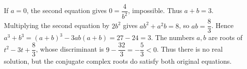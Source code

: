 If $a=0$, the second equation gives $0=\dfrac{4}{b^2}$, impossible. Thus $a+b=3$. Multiplying the second equation by $2b^2$ gives $ab^2+a^2b=8$, so $ab=\dfrac{8}{3}$. Hence $a^3+b^3=(a+b)^3-3ab(a+b)=27-24=\boxed3$. The numbers $a,b$ are roots of $t^2-3t+\dfrac{8}{3}$, whose discriminant is $9-\dfrac{32}{3}=-\dfrac{5}{3}<0$. Thus there is no real solution, but the conjugate complex roots do satisfy both original equations.
